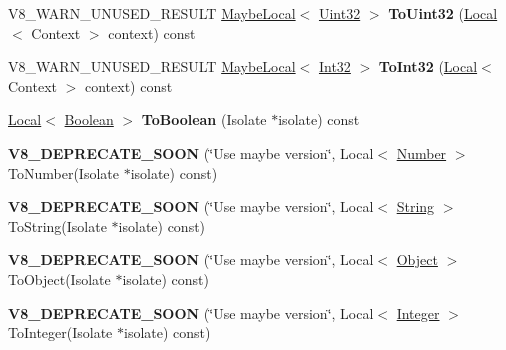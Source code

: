 \begin{DoxyCompactItemize}
\item 
\mbox{\label{classv8_1_1Value_ad1cd3fe01321b0763124cb63783b3aa7}} 
V8\+\_\+\+W\+A\+R\+N\+\_\+\+U\+N\+U\+S\+E\+D\+\_\+\+R\+E\+S\+U\+LT \mbox{\hyperlink{classv8_1_1MaybeLocal}{Maybe\+Local}}$<$ \mbox{\hyperlink{classv8_1_1Uint32}{Uint32}} $>$ {\bfseries To\+Uint32} (\mbox{\hyperlink{classv8_1_1Local}{Local}}$<$ Context $>$ context) const
\item 
\mbox{\label{classv8_1_1Value_a39ab0f7e2389fb5c0c1856987abe15df}} 
V8\+\_\+\+W\+A\+R\+N\+\_\+\+U\+N\+U\+S\+E\+D\+\_\+\+R\+E\+S\+U\+LT \mbox{\hyperlink{classv8_1_1MaybeLocal}{Maybe\+Local}}$<$ \mbox{\hyperlink{classv8_1_1Int32}{Int32}} $>$ {\bfseries To\+Int32} (\mbox{\hyperlink{classv8_1_1Local}{Local}}$<$ Context $>$ context) const
\item 
\mbox{\label{classv8_1_1Value_a57787e7a667538a7fb46a4463b0fc95f}} 
\mbox{\hyperlink{classv8_1_1Local}{Local}}$<$ \mbox{\hyperlink{classv8_1_1Boolean}{Boolean}} $>$ {\bfseries To\+Boolean} (Isolate $\ast$isolate) const
\item 
\mbox{\label{classv8_1_1Value_a855a0b74584b9c322c04891783f37e9c}} 
{\bfseries V8\+\_\+\+D\+E\+P\+R\+E\+C\+A\+T\+E\+\_\+\+S\+O\+ON} (\char`\"{}Use maybe version\char`\"{}, Local$<$ \mbox{\hyperlink{classv8_1_1Number}{Number}} $>$ To\+Number(Isolate $\ast$isolate) const)
\item 
\mbox{\label{classv8_1_1Value_a898f773c591e760fcb98e99cccff3e5c}} 
{\bfseries V8\+\_\+\+D\+E\+P\+R\+E\+C\+A\+T\+E\+\_\+\+S\+O\+ON} (\char`\"{}Use maybe version\char`\"{}, Local$<$ \mbox{\hyperlink{classv8_1_1String}{String}} $>$ To\+String(Isolate $\ast$isolate) const)
\item 
\mbox{\label{classv8_1_1Value_a4c98939a72d6c48b01c8279cfe218d34}} 
{\bfseries V8\+\_\+\+D\+E\+P\+R\+E\+C\+A\+T\+E\+\_\+\+S\+O\+ON} (\char`\"{}Use maybe version\char`\"{}, Local$<$ \mbox{\hyperlink{classv8_1_1Object}{Object}} $>$ To\+Object(Isolate $\ast$isolate) const)
\item 
\mbox{\label{classv8_1_1Value_aae926c4392edf0ad4a5383ab0d8af4b1}} 
{\bfseries V8\+\_\+\+D\+E\+P\+R\+E\+C\+A\+T\+E\+\_\+\+S\+O\+ON} (\char`\"{}Use maybe version\char`\"{}, Local$<$ \mbox{\hyperlink{classv8_1_1Integer}{Integer}} $>$ To\+Integer(Isolate $\ast$isolate) const)

\end{DoxyCompactItemize}
